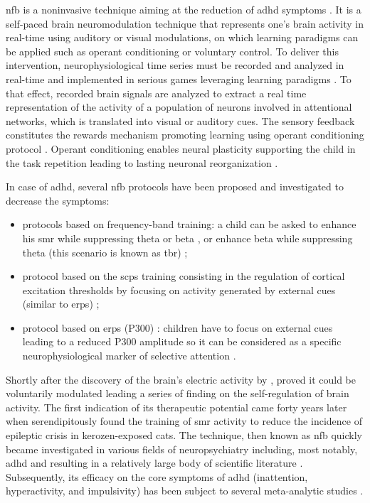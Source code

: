 \gls{nfb} is a noninvasive technique aiming at the reduction of \gls{adhd} symptoms \citep{Arns2015, Steffert2010,
Marzbani2016}. It is a self-paced brain neuromodulation technique that represents one's brain activity in real-time
using auditory or visual modulations, on which learning paradigms can be applied such as operant conditioning
\citep{Reynolds1975} or voluntary control. To deliver this intervention, neurophysiological time series must be recorded
and analyzed in real-time and implemented in serious games leveraging learning paradigms \citep{Wang2010}. To that
effect, recorded brain signals are analyzed to extract a real time representation of the activity of a population of
neurons involved in attentional networks, which is translated into visual or auditory cues. The sensory feedback
constitutes the rewards mechanism promoting learning using operant conditioning protocol \citep{Sherlin2011}. Operant
conditioning enables neural plasticity supporting the child in the task repetition \citep{Skinner1961} leading to
lasting neuronal reorganization \citep{VanDoren2017}. 

In case of \gls{adhd}, several \gls{nfb} protocols have been proposed and investigated to decrease the symptoms:
\begin{itemize} 
  \item protocols based on frequency-band training: a child can be asked to enhance his \gls{smr} while
    suppressing theta or beta \citep{Lubar1976}, or enhance beta while suppressing theta (this scenario is known as
    \gls{tbr}) \citep{Arns2013}; 
  \item protocol based on the \glspl{scp} training consisting in the regulation of
    cortical excitation thresholds by focusing on activity generated by external cues (similar to \glspl{erp})
    \citep{Heinrich2004, Banaschewski2007}; 
  \item protocol based on \glspl{erp} (P300) \citep{Fouillen2017}: children
    have to focus on external cues leading to a reduced P300 amplitude so it can be considered as a specific
    neurophysiological marker of selective attention \citep{RolandLeBouedec}.  
\end{itemize} 

Shortly after the discovery of the brain's electric activity by \citet{Berger1929}, \citet{Durup1935} proved it could be
voluntarily modulated leading a series of finding on the self-regulation of brain activity. The first indication of its
therapeutic potential came forty years later when \citet{Sterman1974} serendipitously found the training of \gls{smr}
activity to reduce the incidence of epileptic crisis in kerozen-exposed cats. The technique, then known as \gls{nfb}
quickly became investigated in various fields of neuropsychiatry including, most notably, \gls{adhd} and resulting in a
relatively large body of scientific literature \citep{Lubar1976, Rossiter1995, Linden1996, Maurizio2014}. Subsequently,
its efficacy on the core symptoms of \gls{adhd} (inattention, hyperactivity, and impulsivity) has been subject to several
meta-analytic studies \citep{Loo2005, Lofthouse2012, Arns2009, Micoulaud2014, Sonuga-Barke2013}. 

